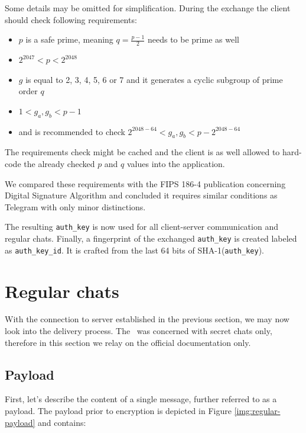 \documentclass[thesis=M,english]{FITthesis}[2012/10/20]
\begin{document}
Some details may be omitted for simplification. During the exchange the client should check following requirements:\label{crypto-prime-req}

\begin{itemize}
	\item $p$ is a safe prime, meaning $q = \frac{p-1}{2}$ needs to be prime as well
	\item $2^{2047} < p < 2^{2048}$
	\item $g$ is equal to 2, 3, 4, 5, 6 or 7 and it generates a cyclic subgroup of prime order $q$
	\item $1 < g_a, g_b < p-1$
	\item and is recommended to check $2^{2048-64} < g_a, g_b < p - 2^{2048-64}$
\end{itemize}

The requirements check might be cached and the client is as well allowed to hard-code the already checked $p$ and $q$ values into the application.

We compared these requirements with the FIPS 186-4 publication concerning Digital Signature Algorithm and concluded it requires similar conditions as Telegram with only minor distinctions.

The resulting \texttt{auth\_key} is now used for all client-server communication and regular chats. Finally, a fingerprint of the exchanged \texttt{auth\_key} is created labeled as \texttt{auth\_key\_id}. It is crafted from the last 64 bits of SHA-1(\texttt{auth\_key}).



\section{Regular chats}\label{crypto-regular}

With the connection to server established in the previous section, we may now look into the delivery process. The~\cite{telegram-aarhus} was concerned with secret chats only, therefore in this section we relay on the official documentation only.


\subsection{Payload}\label{crypto-regular-payload}

First, let's describe the content of a single message, further referred to as a payload. The payload prior to encryption is depicted in Figure \ref{img:regular-payload} and contains:
\end{document}
